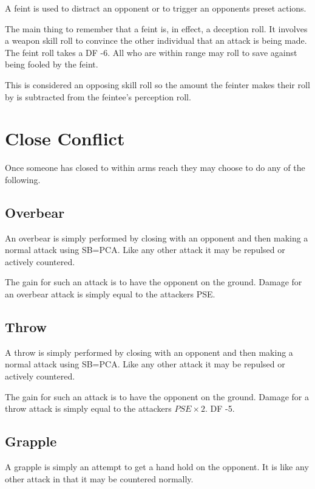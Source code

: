 A feint is used to distract an opponent or to trigger an opponents 
preset actions. 

The main thing to remember that a feint is, in effect, a deception 
roll. It involves a weapon skill roll to convince the other 
individual that an attack is being made. The feint roll takes a DF 
-6. All who are within range may roll to save against 
being fooled by the feint. 

This is considered an opposing skill roll so the amount the feinter makes
their roll by is subtracted from the feintee's perception roll.

\section{Close Conflict}

Once someone has closed to within arms reach they may choose to do
any of the following.

\subsection{Overbear}

An overbear is simply performed by closing with an opponent and then 
making a normal attack using SB=PCA. Like any other attack it may be 
repulsed or actively countered.

The gain for such an attack is to have the opponent on the ground.
Damage for an overbear attack is simply equal to the attackers PSE.

\subsection{Throw}

A throw is simply performed by closing with an opponent and then 
making a normal attack using SB=PCA. Like any other attack it may be 
repulsed or actively countered.

The gain for such an attack is to have the opponent on the ground.
Damage for a throw attack is simply equal to the attackers \( PSE \times 2\). 
DF -5.

\subsection{Grapple}

A grapple is simply an attempt to get a hand hold on the opponent. 
It is like any other attack in that it may be countered normally.

